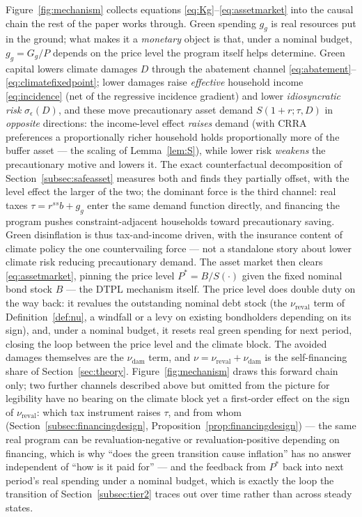 \documentclass[12pt]{article}
\newcommand{\Sfun}{S}
\begin{document}
Figure~\ref{fig:mechanism} collects equations \eqref{eq:Kg}--\eqref{eq:assetmarket}
into the causal chain the rest of the paper works through. Green spending
$g_g$ is real resources put in the ground; what makes it a \emph{monetary}
object is that, under a nominal budget, $g_g = G_g/P$ depends on the price
level the program itself helps determine. Green capital lowers climate
damages $D$ through the abatement channel \eqref{eq:abatement}--\eqref{eq:climatefixedpoint};
lower damages raise \emph{effective} household income
\eqref{eq:incidence} (net of the regressive incidence gradient) and lower
\emph{idiosyncratic risk} $\sigma_\epsilon(D)$, and these move
precautionary asset demand $\Sfun(1+r;\tau,D)$ in \emph{opposite}
directions: the income-level effect \emph{raises} demand (with CRRA
preferences a proportionally richer household holds proportionally more
of the buffer asset --- the scaling of Lemma~\ref{lem:S}), while lower
risk \emph{weakens} the precautionary motive and lowers it. The exact
counterfactual decomposition of Section~\ref{subsec:safeasset} measures
both and finds they partially offset, with the level effect the larger of
the two; the dominant force is the third channel: real taxes
$\tau = r^{ss}b + g_g$ enter the same demand function directly, and
financing the program pushes constraint-adjacent households toward
precautionary saving. Green disinflation is thus tax-and-income driven,
with the insurance content of climate policy the one countervailing
force --- not a standalone story about lower climate risk reducing
precautionary demand. The asset market then clears
\eqref{eq:assetmarket}, pinning the price level $P^{*}=B/\Sfun(\cdot)$
given the fixed nominal bond stock $B$ --- the DTPL mechanism itself.
The price level does double duty on the way back: it revalues the
outstanding nominal debt stock (the $\nu_{\mathrm{reval}}$ term of
Definition~\ref{def:nu}, a windfall or a levy on existing bondholders
depending on its sign), and, under a nominal budget, it resets real green
spending for next period, closing the loop between the price level and
the climate block. The avoided damages themselves are the
$\nu_{\mathrm{dam}}$ term, and $\nu=\nu_{\mathrm{reval}}+\nu_{\mathrm{dam}}$
is the self-financing share of Section~\ref{sec:theory}. Figure~\ref{fig:mechanism}
draws this forward chain only; two further channels described above but
omitted from the picture for legibility have no bearing on the climate
block yet a first-order effect on the sign of $\nu_{\mathrm{reval}}$: which
tax instrument raises $\tau$, and from whom
(Section~\ref{subsec:financingdesign}, Proposition~\ref{prop:financingdesign})
--- the same real program can be revaluation-negative or
revaluation-positive depending on financing, which is why ``does the
green transition cause inflation'' has no answer independent of ``how is
it paid for'' --- and the feedback from $P^{*}$ back into next period's
real spending under a nominal budget, which is exactly the loop the
transition of Section~\ref{subsec:tier2} traces out over time rather than
across steady states.
\end{document}
